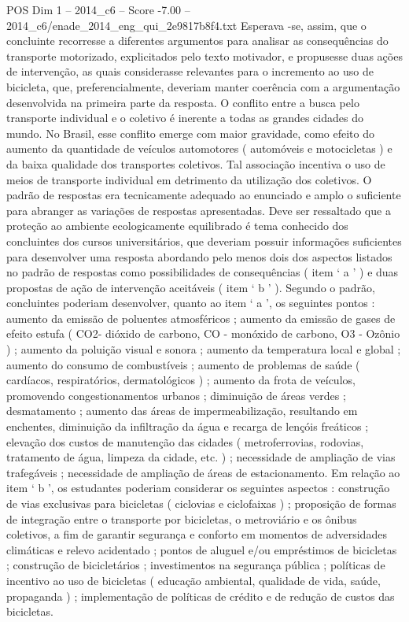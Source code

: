 \begin{textsample}{POS Dim 1 – 2014\_c6 – Score -7.00 – 2014\_c6/enade\_2014\_eng\_qui\_2e9817b8f4.txt}
Esperava -se, assim, que o concluinte recorresse a diferentes argumentos para analisar as consequências do transporte motorizado, explicitados pelo texto motivador, e propusesse duas ações de intervenção, as quais considerasse relevantes para o incremento ao uso de bicicleta, que, preferencialmente, deveriam manter coerência com a argumentação desenvolvida na primeira parte da resposta.
O conflito entre a busca pelo transporte individual e o coletivo é inerente a todas as grandes cidades do mundo.
No Brasil, esse conflito emerge com maior gravidade, como efeito do aumento da quantidade de veículos automotores ( automóveis e motocicletas ) e da baixa qualidade dos transportes coletivos.
Tal associação incentiva o uso de meios de transporte individual em detrimento da utilização dos coletivos.
O padrão de respostas era tecnicamente adequado ao enunciado e amplo o suficiente para abranger as variações de respostas apresentadas.
Deve ser ressaltado que a proteção ao ambiente ecologicamente equilibrado é tema conhecido dos concluintes dos cursos universitários, que deveriam possuir informações suficientes para desenvolver uma resposta abordando pelo menos dois dos aspectos listados no padrão de respostas como possibilidades de consequências ( item ‘ a ’ ) e duas propostas de ação de intervenção aceitáveis ( item ‘ b ’ ).
Segundo o padrão, concluintes poderiam desenvolver, quanto ao item ‘ a ’, os seguintes pontos : aumento da emissão de poluentes atmosféricos ; aumento da emissão de gases de efeito estufa ( CO2- dióxido de carbono, CO - monóxido de carbono, O3 - Ozônio ) ; aumento da poluição visual e sonora ; aumento da temperatura local e global ; aumento do consumo de combustíveis ; aumento de problemas de saúde ( cardíacos, respiratórios, dermatológicos ) ; aumento da frota de veículos, promovendo congestionamentos urbanos ; diminuição de áreas verdes ; desmatamento ; aumento das áreas de impermeabilização, resultando em enchentes, diminuição da infiltração da água e recarga de lençóis freáticos ; elevação dos custos de manutenção das cidades ( metroferrovias, rodovias, tratamento de água, limpeza da cidade, etc. ) ; necessidade de ampliação de vias trafegáveis ; necessidade de ampliação de áreas de estacionamento.
Em relação ao item ‘ b ’, os estudantes poderiam considerar os seguintes aspectos : construção de vias exclusivas para bicicletas ( ciclovias e ciclofaixas ) ; proposição de formas de integração entre o transporte por bicicletas, o metroviário e os ônibus coletivos, a fim de garantir segurança e conforto em momentos de adversidades climáticas e relevo acidentado ; pontos de aluguel e/ou empréstimos de bicicletas ; construção de bicicletários ; investimentos na segurança pública ; políticas de incentivo ao uso de bicicletas ( educação ambiental, qualidade de vida, saúde, propaganda ) ; implementação de políticas de crédito e de redução de custos das bicicletas.

\end{textsample}
